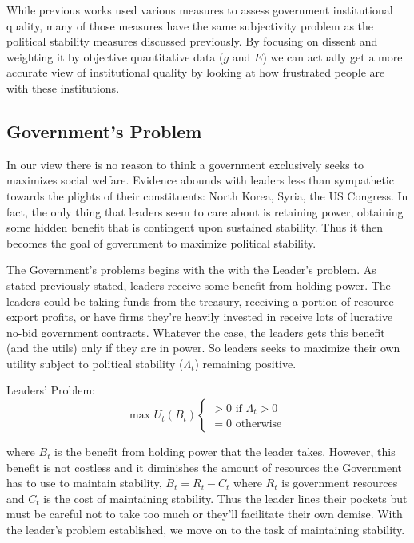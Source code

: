 \documentclass[12pt]{article}
\begin{document}
\begin{spacing}{1.5}

While previous works used various measures to assess government institutional quality, many of those measures have the same subjectivity problem as the political stability measures discussed previously. By focusing on dissent and weighting it by objective quantitative data ($g$ and $E$) we can actually get a more accurate view of institutional quality by looking at how frustrated people are with these institutions.     

\subsection{Government's Problem} 

In our view there is no reason to think a government exclusively seeks to maximizes social welfare. Evidence abounds with leaders less than sympathetic towards the plights of their constituents: North Korea, Syria, the US Congress. In fact, the only thing that leaders seem to care about is retaining power, obtaining some hidden benefit that is contingent upon sustained stability. Thus it then becomes the goal of government to maximize political stability. 

The Government's problems begins with the with the Leader's problem. As stated previously stated, leaders receive some benefit from holding power. The leaders could be taking funds from the treasury, receiving a portion of resource export profits, or have firms they're heavily invested in receive lots of lucrative no-bid government contracts. Whatever the case, the leaders gets this benefit (and the utils) only if they are in power. So leaders seeks to maximize their own utility subject to political stability ($\Lambda_t$) remaining positive.

\vspace{.5 em}
\noindent Leaders' Problem:
\begin{equation}
	 \text{max } U_t(B_t) \begin{cases}
		>0 \text{ if } \Lambda_t > 0 \\
		= 0 \text{ otherwise} 	
	\end{cases}
\end{equation} 

\noindent where $B_t$ is the benefit from holding power that the leader takes. However, this benefit is not costless and it diminishes the amount of resources the Government has to use to maintain stability, $B_t=R_t-C_t$ where $R_t$ is government resources and $C_t$ is the cost of maintaining stability. Thus the leader lines their pockets but must be careful not to take too much or they'll facilitate their own demise. With the leader's problem established, we move on to the task of maintaining stability.   
\vspace{.5 em}


\end{spacing}
\end{document}
